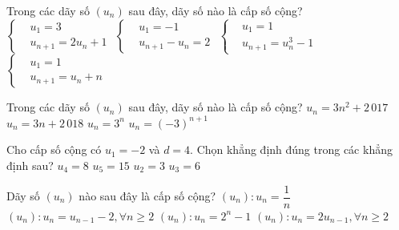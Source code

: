 \begin{ex}%
	 Trong các dãy số $(u_n)$ sau đây, dãy số nào là cấp số cộng?
	 \choice
		{$\left\{\begin{aligned}
		&u_1=3\\ 
		 &u_{n+1}=2u_n+1
\end{aligned}\right.$}
{\True $\left\{\begin{aligned}
 &u_1=-1\\
 &u_{n+1}-u_n=2
\end{aligned}\right.$}
{$\left\{\begin{aligned}
 &u_1=1\\
 &u_{n+1}=u_n^3-1
\end{aligned}\right.$}
{$\left\{\begin{aligned}
 &u_1=1\\
&u_{n+1}=u_n+n 
\end{aligned}\right.$}
\end{ex}

\begin{ex}%
	Trong các dãy số $(u_n)$ sau đây, dãy số nào là cấp  số cộng?
	\choice 
		 {$u_n=3{n^2}+2\,017$}
		 {\True $u_n=3n+2\,018$}
		 {$u_n={3^n}$}
		{$u_n=(-3)^{n+1}$} 
\end{ex}

\begin{ex}%
	Cho cấp  số cộng có $u_1=-2$ và $d=4$. Chọn khẳng định đúng trong các khẳng định sau?
	\choice 
		{$u_4=8$} 
		 {$u_5=15$}
		{$u_2=3$} 
		{\True  $u_3=6$}
\end{ex}

\begin{ex}%
	Dãy số $(u_n)$  nào sau đây là cấp số cộng?
	 \choice
		{$(u_n):  u_n=\dfrac{1}{n}$}
		{\True $(u_n): u_n={u_{n-1}}-2, \forall n\ge  2$}
		{$(u_n):  u_n={2^n}-1$}
		 {$(u_n): u_n=2{u_{n-1}}, \forall n\ge 2$}
\end{ex}

